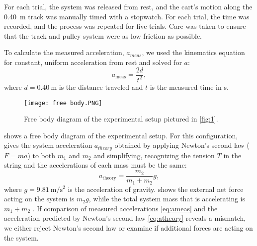 \documentclass[reprint,amsmath,amssymb,aps,twoside]{revtex4-2}
\begin{document}
For each trial, the system was released from rest, and the cart’s motion along the \qty{0.40}{\meter} track was manually timed with a stopwatch. For each trial, the time was recorded, and the process was repeated for five trials. Care was taken to ensure that the track and pulley system were as low friction as possible.

To calculate the measured acceleration, $a_{meas}$, we used the kinematics equation for constant, uniform acceleration from rest \cite{tipler} and solved for $a$:
\begin{equation}
a_{\text{meas}} = \frac{2d}{t^2},
\label{eq:ameas}
\end{equation}
where $d=\qty{0.40}{\meter}$ is the distance traveled and $t$ is the measured time in \unit{\second}. 

\begin{figure}
\begin{center}
\texttt{[image: free body.PNG]}
\end{center}
\caption{\label{fig:fbd} Free body diagram of the experimental setup pictured in \cref{fig:1}.}
\end{figure}

 shows a free body diagram of the experimental setup. For this configuration, \cite{tipler} gives the system acceleration $a_{theory}$ obtained by applying Newton's second law ($F=ma$) to both $m_1$ and $m_2$ and simplifying, recognizing the tension $T$ in the string and the accelerations of each mass must be the same:
\begin{equation}
a_{\text{theory}} = \frac{m_2}{m_1 + m_2}g,
\label{eq:atheory}
\end{equation}
where $g=\qty{9.81}{\meter\per\second\squared}$ is the acceleration of gravity.  shows the external net force acting on the system is $m_2 g$, while the total system mass that is accelerating is $m_1+m_2$ \cite{tipler}. If comparison of measured accelerations \cref{eq:ameas} and the acceleration predicted by Newton's second law \cref{eq:atheory} reveals a mismatch, we either reject Newton's second law or examine if additional forces are acting on the system. 
\end{document}
